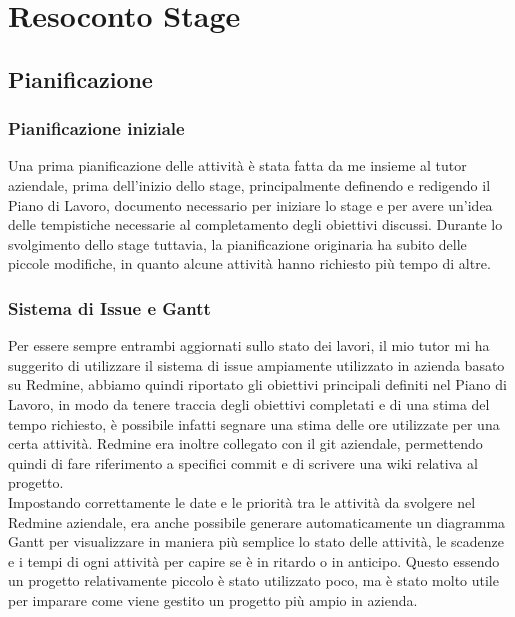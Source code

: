 
\chapter{Resoconto Stage}
\label{cap:resoconto-stage}

\section{Pianificazione}
\subsection{Pianificazione iniziale}\label{sec:pianificazione-iniziale}
Una prima pianificazione delle attività è stata fatta da me insieme al tutor aziendale, prima dell'inizio dello stage, principalmente definendo e redigendo il Piano di Lavoro, documento necessario per iniziare lo stage e per avere un'idea delle tempistiche necessarie al completamento degli obiettivi discussi. Durante lo svolgimento dello stage tuttavia, la pianificazione originaria ha subito delle piccole modifiche, in quanto alcune attività hanno richiesto più tempo di altre. 

\subsection{Sistema di Issue e Gantt}
Per essere sempre entrambi aggiornati sullo stato dei lavori, il mio tutor mi ha suggerito di utilizzare il sistema di issue ampiamente utilizzato in azienda basato su Redmine, abbiamo quindi riportato gli obiettivi principali definiti nel Piano di Lavoro, in modo da tenere traccia degli obiettivi completati e di una stima del tempo richiesto, è possibile infatti segnare una stima delle ore utilizzate per una certa attività. Redmine era inoltre collegato con il git aziendale, permettendo quindi di fare riferimento a specifici commit e di scrivere una wiki relativa al progetto.
\\
Impostando correttamente le date e le priorità tra le attività da svolgere nel Redmine aziendale, era anche possibile generare automaticamente un diagramma Gantt per visualizzare in maniera più semplice lo stato delle attività, le scadenze e i tempi di ogni attività per capire se è in ritardo o in anticipo. Questo essendo un progetto relativamente piccolo è stato utilizzato poco, ma è stato molto utile per imparare come viene gestito un progetto più ampio in azienda.

